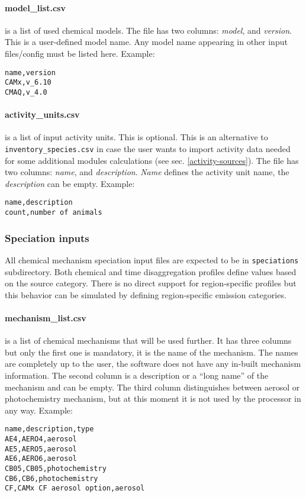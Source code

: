 \documentclass[a4paper,11pt]{article}
\begin{document}
\paragraph{model\_list.csv}
is a list of used chemical models. The file has two columns: {\em model},
and {\em version}. This is a user-defined model name. Any model name
appearing in other input files/config must be listed here. Example:
\begin{verbatim}
name,version
CAMx,v_6.10
CMAQ,v_4.0
\end{verbatim}

\paragraph{activity\_units.csv}
is a list of input activity units. This is optional. This is an alternative to \texttt{inventory\_species.csv} in case the user wants to import activity data needed for some additional modules calculations (see sec. \ref{activity-sources}). The file has two columns: {\em name}, and {\em description}. {\em Name} defines the activity unit name, the {\em description} can be empty. Example:
\begin{verbatim}
name,description
count,number of animals
\end{verbatim}


\subsubsection{Speciation inputs}\label{speciation-inputs}
All chemical mechanism speciation input files are expected to be in \verb|speciations| subdirectory. Both chemical and time disaggregation profiles define values based on the source category. There is no direct support for region-specific profiles but this behavior can be simulated by defining region-specific emission categories. 

\paragraph{mechanism\_list.csv} is a list of chemical mechanisms that will be used further. It has three columns but only the first one is mandatory, it is the name of the mechanism. The names are completely up to the user, the software does not have any in-built mechanism information. The second column is a description or a ``long name'' of the mechanism and can be empty. The third column distinguishes between aerosol or photochemistry mechanism, but at this moment it is not used by the processor in any way. Example:
\begin{verbatim}
name,description,type
AE4,AERO4,aerosol
AE5,AERO5,aerosol
AE6,AERO6,aerosol
CB05,CB05,photochemistry
CB6,CB6,photochemistry
CF,CAMx CF aerosol option,aerosol
\end{verbatim}
\end{document}
